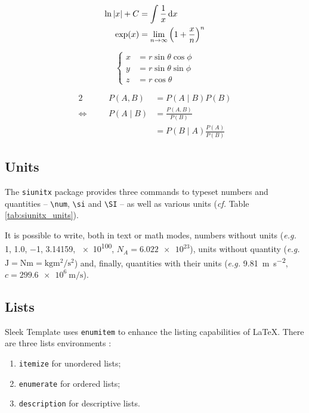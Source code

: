 \documentclass[a4paper, 12pt]{report}
\def\tbs{\textbackslash}
\begin{document}
    \begin{align*}
        \ln \left|x\right| + C & = \int \frac{1}{x} \,\mathrm{d} x \\
        \exp(x) & = \lim_{n \to \infty} \left(1 + \frac{x}{n}\right)^n
    \end{align*}

    \begin{equation}
        \left\{
        \begin{aligned}
            x & = r \sin \theta \cos \phi \\
            y & = r \sin \theta \sin \phi \\
            z & = r \cos \theta
        \end{aligned}
        \right.
    \end{equation}

    \begin{alignat*}{2}
                              & & P(A, B)  & = P(A \mid B) P(B)                        \\
        \Leftrightarrow \quad & & P(A \mid B) & = \frac{P(A, B)}{P(B)}                 \\
                              & &          & = P(B \mid A) \frac{P(A)}{P(B)}
    \end{alignat*}

    \subsection{Units}

    The \texttt{siunitx} package provides three commands to typeset numbers and quantities -- \texttt{\tbs{}num}, \texttt{\tbs{}si} and \texttt{\tbs{}SI} -- as well as various units (\emph{cf.} Table \ref{tab:siunitx_units}).

    It is possible to write, both in text or math modes, numbers without units (\emph{e.g.} \num{1}, \num{1.0}, \num{-1}, \num{3.14159}, \num{e100}, $N_A = \num{6.022e23}$), units without quantity (\emph{e.g.} $\si{\joule} = \si{\newton\meter} = \si{\kilogram\meter\squared\per\second\squared}$) and, finally, quantities with their units (\emph{e.g.} \SI{9.81}{\meter\per\second\squared}, $c = \SI{299.6e6}{\meter\per\second}$).

    \subsection{Lists}

    Sleek Template uses \texttt{enumitem} to enhance the listing capabilities of \LaTeX{}. There are three lists environments :
    \begin{enumerate}
        \item \texttt{itemize} for unordered lists;
        \item \texttt{enumerate} for ordered lists;
        \item \texttt{description} for descriptive lists.
    \end{enumerate}
\end{document}
